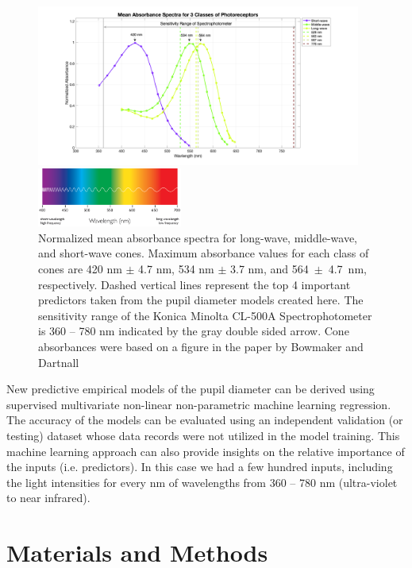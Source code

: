 \documentclass[10pt]{article}
\begin{document}
\begin{figure}[!t]
    \includegraphics[width=0.95\textwidth]{./spectrum/AbsorbanceSpectra.png}
    
    \hspace{1.5in}\includegraphics[width=0.425\textwidth]{./spectrum/light-spectrum.png}
    
    \caption{Normalized mean absorbance spectra for long-wave, middle-wave, and short-wave cones. Maximum absorbance values for each class of cones are 420 nm $\pm$ 4.7 nm, 534 nm $\pm$ 3.7 nm, and \hbox{564 $\pm$ 4.7 nm}, respectively. Dashed vertical lines represent the top 4 important predictors taken from the pupil diameter models created here. The sensitivity range of the Konica Minolta CL-500A Spectrophotometer is 360 -- 780 nm indicated by the gray double sided arrow. Cone absorbances were based on a figure in the  paper by Bowmaker and Dartnall \cite{BowmakerCones}}
    \label{fig:absorbances}
\end{figure}

New predictive empirical models of the pupil diameter can be derived using supervised multivariate non-linear non-parametric machine learning regression. The accuracy of the models can be evaluated using an independent validation (or testing) dataset whose data records were not utilized in the model training. This machine learning approach can also provide insights on the relative importance of the inputs (i.e. predictors). In this case we had a few hundred inputs, including the light intensities for every nm of wavelengths from 360 -- 780 nm (ultra-violet to near infrared). 

\section{Materials and Methods}
\end{document}
